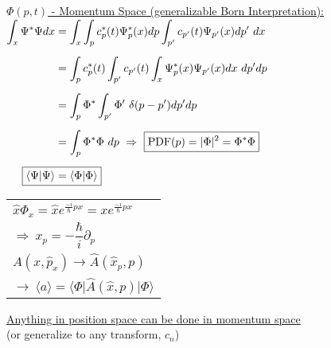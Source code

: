 \documentclass[12pt]{article}
\begin{document}
\newpage
\noindent
\underline{\(\Phi(p,t)\) - Momentum Space (generalizable Born Interpretation):}
\hfill \break \\
\( \begin{aligned}[t]
    \int_x \Psi^* \Psi dx 
        &= \int_x 
        \int_{p} c_p^*(t) \Psi_p^*(x) dp
        \int_{p'} c_{p'}(t) \Psi_{p'}(x) dp' \ dx \\[5pt]
    &= \int_{p} c_p^*(t) \int_{p'} c_{p'}(t)
        \int_x \Psi_p^*(x) \Psi_{p'}(x) dx \ dp' dp \\[5pt]
    &= \int_{p} \Phi^* \int_{p'} \Phi' \ \delta(p-p') dp' dp \\[5pt]
    &= \int_p \Phi^* \Phi \ dp \ \Rightarrow \ 
        \boxed{ \text{PDF}(p) = | \Phi |^2 = \Phi^* \Phi } \\[5pt]
    \Aboxed{ \langle \Psi | \Psi \rangle &= \langle \Phi | \Phi \rangle }
\end{aligned} \)
\hspace{0.075\textwidth}
\begin{tabular}[t]{p{6cm}}
    \( \hat{x} \Phi_x = \hat{x} e^{\frac{-i}{\hbar} px} = x e^{\frac{-i}{\hbar} px} \) \\[5pt]
    \( \Rightarrow \ \boxed{ \hat{x}_p = - \dfrac{\hbar}{i} \partial_p } \) \\[30pt]
    \( \widehat{A}(x, \hat{p}_x) \rightarrow \widehat{A}(\hat{x}_p, p) \) \\[5pt]
    \( \rightarrow \ \boxed{ \langle a \rangle = \Big\langle \Phi \Big| 
        \widehat{A}(\hat{x}, p) \Big| \Phi \Big\rangle } \)
\end{tabular}

\begin{center}
    \underline{Anything in position space can be done in momentum space}\\[5pt]
    (or generalize to any transform, \(c_n\))
\end{center}
\end{document}
